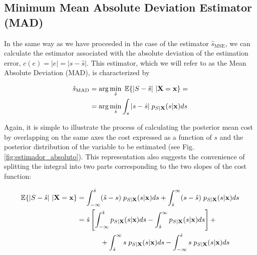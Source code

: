 \subsection{Minimum Mean Absolute Deviation Estimator (MAD)}

In the same way as we have proceeded in the case of the estimator $\hat s_\text{MSE}$, we can calculate the estimator associated with the absolute deviation of the estimation error, $c(e) = |e| = |s - \hat s|$. This estimator, which we will refer to as the Mean Absolute Deviation (MAD), is characterized by

\begin{equation}
\label{ec:coste_MAD}
\begin{split}
\hat s_{\text{MAD}} & = \arg\min_{\hat s}\; \mathbb{E}\{|S - \hat s|~|{\bf X} = {\bf x} \} = \\
& = \arg\min_{\hat s} \int_s |s - \hat s|\;p_{S|{\bf X}}(s|{\bf x}) ds
\end{split}
\end{equation}


Again, it is simple to illustrate the process of calculating the posterior mean cost by overlapping on the same axes the cost expressed as a function of $s$ and the posterior distribution of the variable to be estimated (see Fig. \ref{fig:estimador_absoluto}). This representation also suggests the convenience of splitting the integral into two parts corresponding to the two slopes of the cost function:


\begin{equation}
\begin{split}
\mathbb{E}\{|S - \hat s|~|{\bf X} = {\bf x} \} &= \int_{-\infty}^{\hat s} (\hat s - s) \;p_{S|{\bf X}}(s|{\bf x}) ds + \int_{\hat s}^\infty (s - \hat s) \;p_{S|{\bf X}}(s|{\bf x}) ds \\
& = \hat s \left[ \int_{-\infty}^{\hat s} p_{S|{\bf X}}(s|{\bf x}) ds -  \int_{\hat s}^{\infty} p_{S|{\bf X}}(s|{\bf x}) ds\right] + \\
&\;\;\;\;\;\;\;\;\;\;\;\; + \int_{\hat s}^{\infty} s\;p_{S|{\bf X}}(s|{\bf x}) ds -  \int_{-\infty}^{\hat s} s \; p_{S|{\bf X}}(s|{\bf x}) ds
\end{split}
\end{equation}

